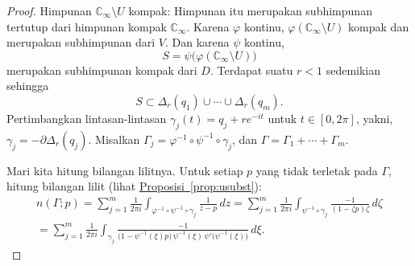 \documentclass[12pt,openany]{book}
\newcommand{\C}{{\mathbb{C}}}
\theoremstyle{plain}
\theoremstyle{remark}
\theoremstyle{definition}
\theoremstyle{exercise}
\theoremstyle{example}
\newcommand{\propref}[1]{\hyperref[#1]{Proposisi~\ref*{#1}}}
\begin{document}
\begin{proof}
Himpunan $\C_\infty \setminus U$ kompak: Himpunan itu merupakan subhimpunan tertutup dari
himpunan kompak $\C_\infty$. Karena $\varphi$ kontinu,
$\varphi(\C_\infty \setminus U)$ kompak dan merupakan subhimpunan dari $V$.
Dan karena $\psi$ kontinu,
\begin{equation*}
S = \psi\bigl(\varphi(\C_\infty \setminus U)\bigr)
\end{equation*}
merupakan subhimpunan kompak dari $D$. Terdapat suatu $r < 1$ sedemikian sehingga
\begin{equation*}
S \subset \Delta_r(q_1) \cup \cdots \cup \Delta_r(q_m) .
\end{equation*}
Pertimbangkan lintasan-lintasan $\gamma_j(t) = q_j + r e^{-it}$ untuk $t \in
[0,2\pi]$,
yakni, $\gamma_j = -\partial
\Delta_r(q_j)$.
Misalkan $\Gamma_j=\varphi^{-1} \circ \psi^{-1} \circ \gamma_j$, dan $\Gamma = \Gamma_1 +
\cdots + \Gamma_m$.

Mari kita hitung bilangan lilitnya.
Untuk setiap $p$ yang tidak terletak pada $\Gamma$, hitung
bilangan lilit (lihat \propref{prop:usubst}):
\begin{multline*}
n(\Gamma;p) =
\sum_{j=1}^m
\frac{1}{2\pi i}
\int_{\varphi^{-1} \circ \psi^{-1} \circ \gamma_j}
\frac{1}{z-p} \, dz
=
\sum_{j=1}^m
\frac{1}{2\pi i}
\int_{\psi^{-1} \circ \gamma_j}
\frac{-1}{(1-\zeta p) \zeta} \, d\zeta
\\
=
\sum_{j=1}^m
\frac{1}{2\pi i}
\int_{\gamma_j}
\frac{-1}{ \bigl( 1-\psi^{-1}(\xi)p \bigr)
\,
\psi^{-1}(\xi)
\,
\psi' \bigl(\psi^{-1}(\xi)\bigr)} \, d \xi .
\end{multline*}


\end{proof}
\end{document}
